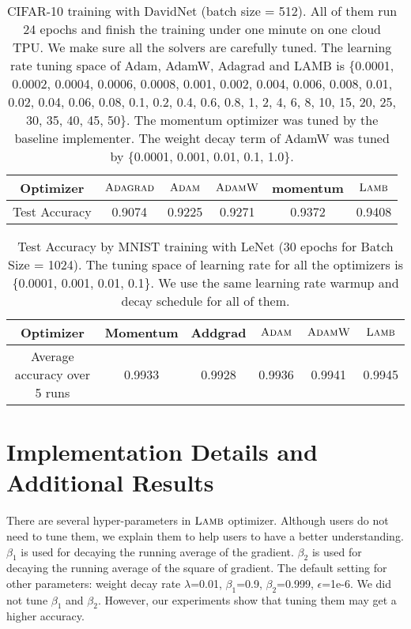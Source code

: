 \documentclass{article} \usepackage{iclr2020_conference,times}
\newcommand{\adagrad}{\textsc{Adagrad}}
\newcommand{\adam}{\textsc{Adam}}
\newcommand{\adamw}{\textsc{AdamW}}
\newcommand{\lamb}{\textsc{Lamb}}
\begin{document}
\begin{table}[ht]
\renewcommand{\arraystretch}{1.3}
\caption{ CIFAR-10 training with DavidNet (batch size = 512). All of them run 24 epochs and finish the training under one minute on one cloud TPU. We make sure all the solvers are carefully tuned. The learning rate tuning space of Adam, AdamW, Adagrad and LAMB is \{0.0001, 0.0002, 0.0004, 0.0006, 0.0008, 0.001, 0.002, 0.004, 0.006, 0.008, 0.01, 0.02, 0.04, 0.06, 0.08, 0.1, 0.2, 0.4, 0.6, 0.8, 1, 2, 4, 6, 8, 10, 15, 20, 25, 30, 35, 40, 45, 50\}. The momentum optimizer was tuned by the baseline implementer. The weight decay term of AdamW was tuned by \{0.0001, 0.001, 0.01, 0.1, 1.0\}.}
\centering
\begin{tabular}{|c|c|c|c|c|c|}
\hline
Optimizer & $\adagrad$ & $\adam$ & $\adamw$ & momentum & $\lamb$ \\
\hline
\hline
Test Accuracy & 0.9074 & 0.9225 & 0.9271 & 0.9372 & 0.9408 \\
\hline
\end{tabular}
\label{table:cifar10_davidnet}
\end{table}




\begin{table}[ht]
\renewcommand{\arraystretch}{1.3}
\caption{ Test Accuracy by MNIST training with LeNet (30 epochs for Batch Size = 1024). The tuning space of learning rate for all the optimizers is \{0.0001, 0.001, 0.01, 0.1\}. We use the same learning rate warmup and decay schedule for all of them.}
\centering
\begin{tabular}{|c|c|c|c|c|c|}
\hline
Optimizer & Momentum & Addgrad & $\adam$ & $\adamw$ & $\lamb$ \\
\hline
\hline
Average accuracy over 5 runs & 0.9933  & 0.9928 & 0.9936 & 0.9941 & 0.9945  \\
\hline
\end{tabular}
\label{table:mnist_results}
\end{table}

\section{Implementation Details and Additional Results}

There are several hyper-parameters in $\lamb$ optimizer. 
Although users do not need to tune them, we explain them to help users to have a better understanding.
${\beta}_1$ is used for decaying the running average of the gradient.
${\beta}_2$ is used for decaying the running average of the square of gradient.
The default setting for other parameters: weight decay rate $\lambda$=0.01, ${\beta}_1$=0.9, ${\beta}_2$=0.999, $\epsilon$=1e-6.
We did not tune ${\beta}_1$ and ${\beta}_2$.
However, our experiments show that tuning them may get a higher accuracy.
\end{document}
